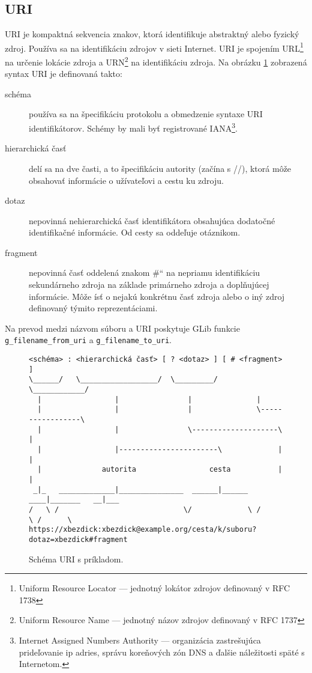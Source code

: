 \documentclass[12pt,oneside,final]{fithesis2}
\newcommand\uv[1]{\quotedblbase #1\textquotedblleft}%
\begin{document}
\subsection{URI} %
URI je kompaktná sekvencia znakov, ktorá identifikuje abstraktný alebo fyzický zdroj. Používa sa na identifikáciu zdrojov v sieti Internet. URI je spojením URL\footnote{Uniform Resource Locator --- jednotný lokátor zdrojov definovaný v RFC 1738} na určenie lokácie zdroja a URN\footnote{Uniform Resource Name --- jednotný názov zdrojov definovaný v RFC 1737} na identifikáciu zdroja. Na obrázku \ref{obr.URI} zobrazená syntax URI je definovaná takto:
\begin{description}
\item[schéma] používa sa na špecifikáciu protokolu a obmedzenie syntaxe URI identifikátorov. Schémy by mali byť registrované IANA\footnote{Internet Assigned Numbers Authority --- organizácia zastrešujúca prideľovanie ip adries, správu koreňových zón DNS a ďalšie náležitosti späté s Internetom.}.
\item[hierarchická časť] delí sa na dve časti, a to špecifikáciu autority (začína s //), ktorá môže obsahovať informácie o užívateľovi a cestu ku zdroju.
\item[dotaz] nepovinná nehierarchická časť identifikátora obsahujúca dodatočné identifikačné informácie. Od cesty sa oddeľuje otáznikom.%
\item[fragment] nepovinná časť oddelená znakom \uv{\#} na nepriamu identifikáciu sekundárneho zdroja na základe primárneho zdroja a doplňujúcej informácie. Môže ísť o nejakú konkrétnu časť zdroja alebo o iný zdroj definovaný týmito reprezentáciami.
\end{description}
Na prevod medzi názvom súboru a URI poskytuje GLib funkcie \\
\verb|g_filename_from_uri| a \verb|g_filename_to_uri|.

\begin{figure}[h]
\begin{tiny}
\begin{verbatim}
<schéma> : <hierarchická časť> [ ? <dotaz> ] [ # <fragment> ] 
\______/   \__________________/  \_________/   \____________/
  |	                |                |               |
  |	                |                |               \-----------------\
  |                 |                \--------------------\	           |
  |	                |-----------------------\             |	           |
  |	             autorita                 cesta	          |	           |
 _|_   _____________|_______________  ______|______   ____|_______   __|___
/   \ /                             \/             \ /            \ /      \
https://xbezdick:xbezdick@example.org/cesta/k/suboru?dotaz=xbezdick#fragment
\end{verbatim}
\end{tiny}
\caption{Schéma URI s príkladom.}
\label{obr.URI}
\end{figure}
\end{document}
